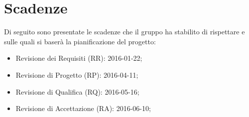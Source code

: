 \section{Scadenze}
Di seguito sono presentate le scadenze che il gruppo ha stabilito di rispettare e sulle quali si baserà la pianificazione del progetto:
\begin{itemize}
\item Revisione dei Requisiti (RR): 2016-01-22;
\item Revisione di Progetto (RP): 2016-04-11;
\item Revisione di Qualifica (RQ): 2016-05-16;
\item Revisione di Accettazione (RA): 2016-06-10;
\end{itemize}
